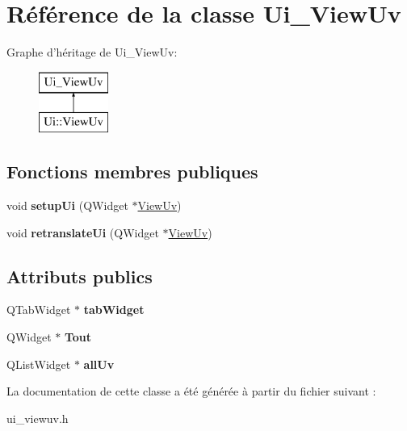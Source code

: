 \hypertarget{class_ui___view_uv}{\section{Référence de la classe Ui\+\_\+\+View\+Uv}
\label{class_ui___view_uv}
}
Graphe d'héritage de Ui\+\_\+\+View\+Uv\+:\begin{figure}[H]
\begin{center}
\leavevmode
\includegraphics[height=2.000000cm]{class_ui___view_uv}
\end{center}
\end{figure}
\subsection*{Fonctions membres publiques}
\begin{DoxyCompactItemize}
\item 
\hypertarget{class_ui___view_uv_a0a1d76d53d9d126148dcdfa53953b071}{void {\bfseries setup\+Ui} (Q\+Widget $\ast$\hyperlink{class_view_uv}{View\+Uv})}\label{class_ui___view_uv_a0a1d76d53d9d126148dcdfa53953b071}

\item 
\hypertarget{class_ui___view_uv_ab8028a558494c465f8ecfcd961548f6e}{void {\bfseries retranslate\+Ui} (Q\+Widget $\ast$\hyperlink{class_view_uv}{View\+Uv})}\label{class_ui___view_uv_ab8028a558494c465f8ecfcd961548f6e}

\end{DoxyCompactItemize}
\subsection*{Attributs publics}
\begin{DoxyCompactItemize}
\item 
\hypertarget{class_ui___view_uv_ac0e008871ce7fcf9b24d3ee970918ba8}{Q\+Tab\+Widget $\ast$ {\bfseries tab\+Widget}}\label{class_ui___view_uv_ac0e008871ce7fcf9b24d3ee970918ba8}

\item 
\hypertarget{class_ui___view_uv_ad1695fcce562e6a3f90aa8aea679fe16}{Q\+Widget $\ast$ {\bfseries Tout}}\label{class_ui___view_uv_ad1695fcce562e6a3f90aa8aea679fe16}

\item 
\hypertarget{class_ui___view_uv_a1fae3922ba661d981f25ee5f3f660d52}{Q\+List\+Widget $\ast$ {\bfseries all\+Uv}}\label{class_ui___view_uv_a1fae3922ba661d981f25ee5f3f660d52}

\end{DoxyCompactItemize}


La documentation de cette classe a été générée à partir du fichier suivant \+:\begin{DoxyCompactItemize}
\item 
ui\+\_\+viewuv.\+h\end{DoxyCompactItemize}
